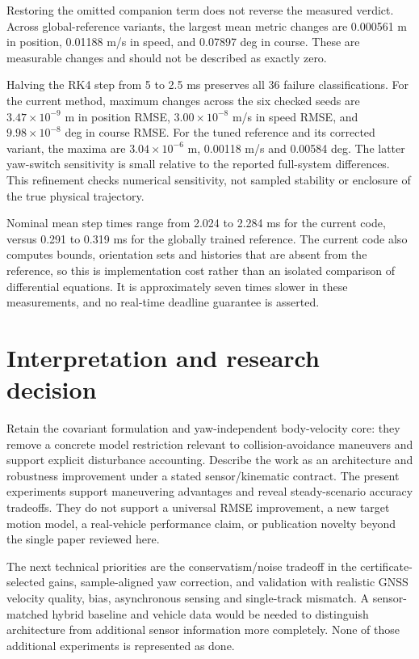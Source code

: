 \documentclass[11pt]{article}
\begin{document}
Restoring the omitted companion term does not reverse the measured verdict.
Across global-reference variants, the largest mean metric changes are
0.000561 m in position, 0.01188 m/s in speed, and 0.07897 deg in course.
These are measurable changes and should not be described as exactly zero.

Halving the RK4 step from 5 to 2.5 ms preserves all 36 failure classifications.
For the current method, maximum changes across the six checked seeds are
$3.47\times10^{-9}$ m in position RMSE, $3.00\times10^{-8}$ m/s in speed RMSE,
and $9.98\times10^{-8}$ deg in course RMSE. For the tuned reference and its
corrected variant, the maxima are $3.04\times10^{-6}$ m, 0.00118 m/s and
0.00584 deg. The latter yaw-switch sensitivity is small relative to the
reported full-system differences. This refinement checks numerical sensitivity,
not sampled stability or enclosure of the true physical trajectory.

Nominal mean step times range from 2.024 to 2.284 ms for the current code,
versus 0.291 to 0.319 ms for the globally trained reference. The current code
also computes bounds, orientation sets and histories that are absent from the
reference, so this is implementation cost rather than an isolated comparison
of differential equations. It is approximately seven times slower in these
measurements, and no real-time deadline guarantee is asserted.

\section{Interpretation and research decision}
Retain the covariant formulation and yaw-independent body-velocity core:
they remove a concrete model restriction relevant to collision-avoidance
maneuvers and support explicit disturbance accounting. Describe the work as
an architecture and robustness improvement under a stated sensor/kinematic
contract. The present experiments support maneuvering advantages and reveal
steady-scenario accuracy tradeoffs. They do not support a universal RMSE
improvement, a new target motion model, a real-vehicle performance claim, or
publication novelty beyond the single paper reviewed here.

The next technical priorities are the conservatism/noise tradeoff in the
certificate-selected gains, sample-aligned yaw correction, and validation
with realistic GNSS velocity quality, bias, asynchronous sensing and
single-track mismatch. A sensor-matched hybrid baseline and vehicle data
would be needed to distinguish architecture from additional sensor information
more completely. None of those additional experiments is represented as done.
\end{document}
